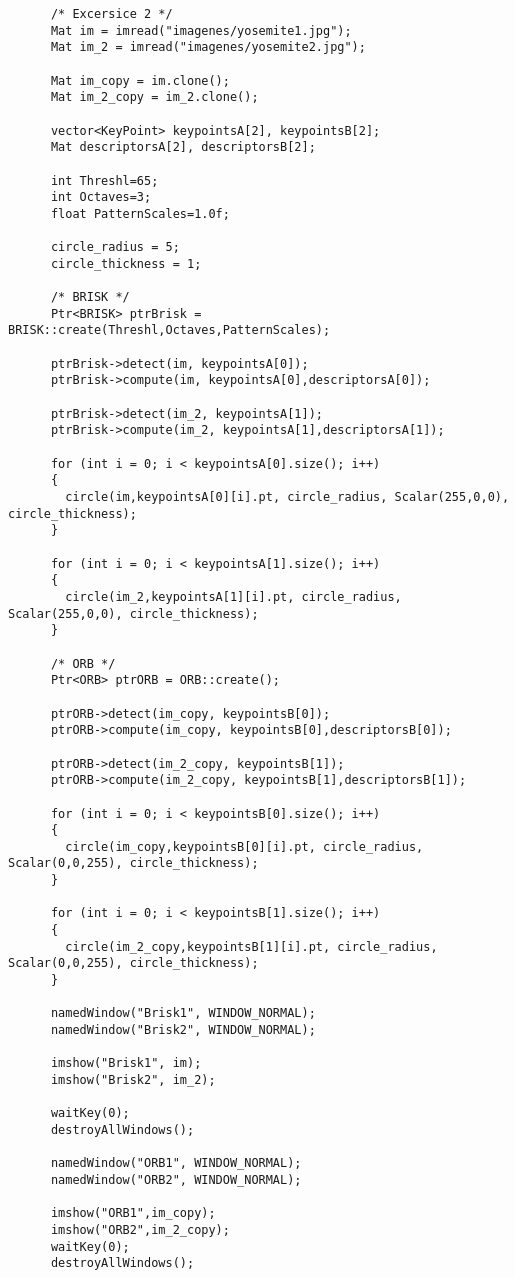 \documentclass[a4paper, 11pt]{article}
\theoremstyle{definition}
\begin{document}
    \begin{lstlisting}
      /* Excersice 2 */
      Mat im = imread("imagenes/yosemite1.jpg");
      Mat im_2 = imread("imagenes/yosemite2.jpg");

      Mat im_copy = im.clone();
      Mat im_2_copy = im_2.clone();

      vector<KeyPoint> keypointsA[2], keypointsB[2];
      Mat descriptorsA[2], descriptorsB[2];

      int Threshl=65;
      int Octaves=3;
      float PatternScales=1.0f;

      circle_radius = 5;
      circle_thickness = 1;

      /* BRISK */
      Ptr<BRISK> ptrBrisk = BRISK::create(Threshl,Octaves,PatternScales);

      ptrBrisk->detect(im, keypointsA[0]);
      ptrBrisk->compute(im, keypointsA[0],descriptorsA[0]);

      ptrBrisk->detect(im_2, keypointsA[1]);
      ptrBrisk->compute(im_2, keypointsA[1],descriptorsA[1]);

      for (int i = 0; i < keypointsA[0].size(); i++)
      {
        circle(im,keypointsA[0][i].pt, circle_radius, Scalar(255,0,0), circle_thickness);
      }

      for (int i = 0; i < keypointsA[1].size(); i++)
      {
        circle(im_2,keypointsA[1][i].pt, circle_radius, Scalar(255,0,0), circle_thickness);
      }

      /* ORB */
      Ptr<ORB> ptrORB = ORB::create();

      ptrORB->detect(im_copy, keypointsB[0]);
      ptrORB->compute(im_copy, keypointsB[0],descriptorsB[0]);

      ptrORB->detect(im_2_copy, keypointsB[1]);
      ptrORB->compute(im_2_copy, keypointsB[1],descriptorsB[1]);

      for (int i = 0; i < keypointsB[0].size(); i++)
      {
        circle(im_copy,keypointsB[0][i].pt, circle_radius, Scalar(0,0,255), circle_thickness);
      }

      for (int i = 0; i < keypointsB[1].size(); i++)
      {
        circle(im_2_copy,keypointsB[1][i].pt, circle_radius, Scalar(0,0,255), circle_thickness);
      }

      namedWindow("Brisk1", WINDOW_NORMAL);
      namedWindow("Brisk2", WINDOW_NORMAL);

      imshow("Brisk1", im);
      imshow("Brisk2", im_2);

      waitKey(0);
      destroyAllWindows();

      namedWindow("ORB1", WINDOW_NORMAL);
      namedWindow("ORB2", WINDOW_NORMAL);

      imshow("ORB1",im_copy);
      imshow("ORB2",im_2_copy);
      waitKey(0);
      destroyAllWindows();
    \end{lstlisting}
\end{document}
